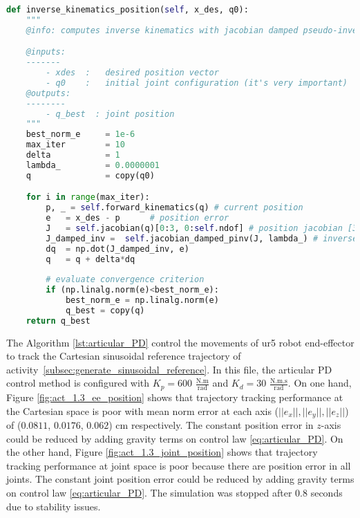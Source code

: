 \begin{lstlisting}[language=Python,caption={Function to compute inverse kinematics with jacobian damped psedo-inverse method.}, label={lst:inverse_kinematics}]
def inverse_kinematics_position(self, x_des, q0):
    """
    @info: computes inverse kinematics with jacobian damped pseudo-inverse.

    @inputs:
    -------
        - xdes  :   desired position vector
        - q0    :   initial joint configuration (it's very important)
    @outputs:
    --------        
        - q_best  : joint position
    """         
    best_norm_e     = 1e-6 
    max_iter        = 10
    delta           = 1
    lambda_         = 0.0000001
    q               = copy(q0)

    for i in range(max_iter):
        p, _ = self.forward_kinematics(q) # current position
        e   = x_des - p      # position error
        J   = self.jacobian(q)[0:3, 0:self.ndof] # position jacobian [3x6]
        J_damped_inv =  self.jacobian_damped_pinv(J, lambda_) # inverse jacobian [6x3]
        dq  = np.dot(J_damped_inv, e)
        q   = q + delta*dq
                   
        # evaluate convergence criterion
        if (np.linalg.norm(e)<best_norm_e):
            best_norm_e = np.linalg.norm(e)
            q_best = copy(q) 
    return q_best 
\end{lstlisting}

The Algorithm \ref{lst:articular_PD} control the movements of ur5 robot end-effector to track the Cartesian sinusoidal reference trajectory of activity~\ref{subsec:generate_sinusoidal_reference}. In this file, the articular PD control method is configured with ${K_{p}}=600$ $\mathrm{\frac{N.m}{rad}}$ and $K_{d}= 30$ $\mathrm{\frac{N.m.s}{rad}}$. On one hand, Figure \ref{fig:act_1.3_ee_position} shows that trajectory tracking performance at the Cartesian space is poor with mean norm error at each axis ($||e_x||, ||e_y||, ||e_z||$) of ($0.0811$, $0.0176$, $0.062$) cm respectively. The constant position error in $z$-axis could be reduced by adding gravity terms on control law \eqref{eq:articular_PD}. On the other hand, Figure \ref{fig:act_1.3_joint_position} shows that trajectory tracking performance at joint space is poor because there are position error in all joints. The constant joint position error could be reduced by adding gravity terms on control law \eqref{eq:articular_PD}. The simulation was stopped after $0.8$ seconds due to stability issues. 

